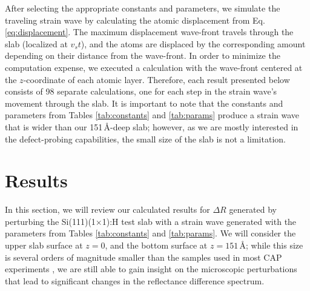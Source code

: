 \documentclass[aps,prb,10pt,showkeys,letterpaper,notitlepage,twocolumn]{revtex4-1}
\begin{document}
After selecting the appropriate constants and parameters, we simulate the
traveling strain wave by calculating the atomic displacement from Eq.
\eqref{eq:displacement}. The maximum displacement wave-front travels through the
slab (localized at $v_{s}t$), and the atoms are displaced by the corresponding
amount depending on their distance from the wave-front. In order to minimize the
computation expense, we executed a calculation with the wave-front centered at
the $z$-coordinate of each atomic layer. Therefore, each result presented below
consists of 98 separate calculations, one for each step in the strain wave's
movement through the slab. It is important to note that the constants and
parameters from Tables  \ref{tab:constants} and \ref{tab:params} produce a
strain wave that is wider than our 151\,\r{A}-deep slab; however, as we are
mostly interested in the defect-probing capabilities, the small size of the slab
is not a limitation.


\section{Results}\label{sec:results}

In this section, we will review our calculated results for $\Delta R$ generated
by perturbing the Si(111)(1$\times$1):H test slab with a strain wave generated
with the parameters from Tables \ref{tab:constants} and \ref{tab:params}. We
will consider the upper slab surface at $z = 0$, and the bottom surface at $z =
151$\,\r{A}; while this size is several orders of magnitude smaller than the
samples used in most CAP experiments \cite{steigerwaldAPL09, steigerwaldJAP12,
cuffePRL13, lawlerMRE14}, we are still able to gain insight on the microscopic
perturbations that lead to significant changes in the reflectance difference
spectrum.
\end{document}
